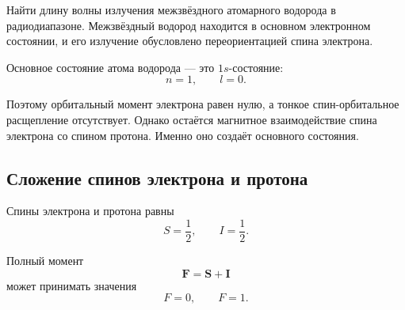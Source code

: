 \documentclass[../final.tex]{subfiles}
\begin{document}






\condition
Найти длину волны излучения межзвёздного атомарного водорода
в радиодиапазоне. Межзвёздный водород находится в основном
электронном состоянии, и его излучение обусловлено переориентацией
спина электрона.



\solution

Основное состояние атома водорода --- это $1s$-состояние:
%
\begin{equation*}
    n=1,
    \qquad
    l=0.
\end{equation*}

Поэтому орбитальный момент электрона равен нулю, а тонкое
спин-орбитальное расщепление отсутствует. Однако остаётся магнитное
взаимодействие спина электрона со спином протона. Именно оно создаёт
 основного состояния.



\subsection*{Сложение спинов электрона и протона}

Спины электрона и протона равны
%
\begin{equation*}
    S=\frac12,
    \qquad
    I=\frac12.
\end{equation*}

Полный момент
%
\begin{equation*}
    \mathbf F
    =
    \mathbf S
    +
    \mathbf I
\end{equation*}
%
может принимать значения
%
\begin{equation*}
    F=0,
    \qquad
    F=1.
\end{equation*}
\end{document}
